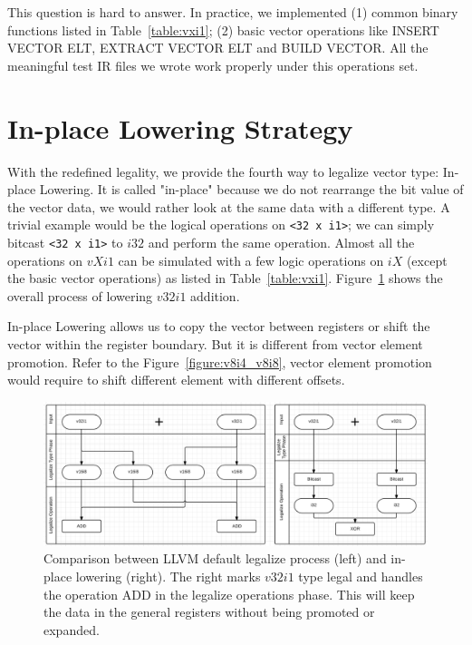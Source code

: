 This question is hard to answer. In practice, we implemented (1) common binary functions listed in Table~\ref{table:vxi1}; (2) basic vector operations like INSERT VECTOR ELT, EXTRACT VECTOR ELT and BUILD VECTOR\@. All the meaningful test IR files we wrote work properly under this operations set.

\section{In-place Lowering Strategy}

With the redefined legality, we provide the fourth way to legalize vector type: In-place Lowering. It is called "in-place" because we do not rearrange the bit value of the vector data, we would rather look at the same data with a different type. A trivial example would be the logical operations on \verb|<32 x i1>|; we can simply bitcast \verb|<32 x i1>| to $i32$ and perform the same operation. Almost all the operations on $vXi1$ can be simulated with a few logic operations on $iX$ (except the basic vector operations) as listed in Table~\ref{table:vxi1}. Figure~\ref{figure:v32i1_compare} shows the overall process of lowering $v32i1$ addition.

In-place Lowering allows us to copy the vector between registers or shift the vector within the register boundary. But it is different from vector element promotion. Refer to the Figure~\ref{figure:v8i4_v8i8}, vector element promotion would require to shift different element with different offsets.

\begin{figure}[ht!]
  \centering
  \includegraphics[width=150mm]{draw/v32i1_compare.png}
  \caption[Comparison between LLVM default legalize process and in-place lowering.]{Comparison between LLVM default legalize process (left) and in-place lowering (right). The right marks $v32i1$ type legal and handles the operation ADD in the legalize operations phase. This will keep the data in the general registers without being promoted or expanded.}
  \label{figure:v32i1_compare}
\end{figure}

